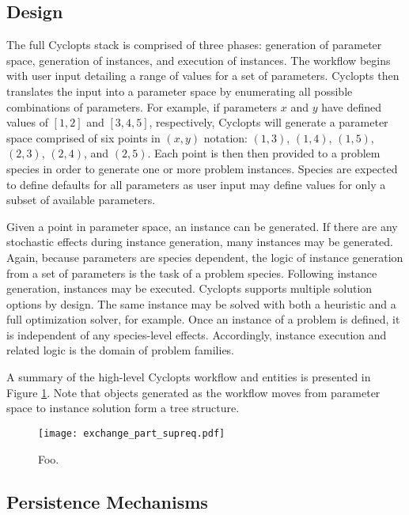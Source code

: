 \subsection{Design}\label{method:tools:struc}

The full Cyclopts stack is comprised of three phases: generation of parameter
space, generation of instances, and execution of instances. The workflow begins
with user input detailing a range of values for a set of parameters. Cyclopts
then translates the input into a parameter space by enumerating all possible
combinations of parameters. For example, if parameters $x$ and $y$ have defined
values of $[1, 2]$ and $[3, 4, 5]$, respectively, Cyclopts will generate a
parameter space comprised of six points in $(x, y)$ notation: $(1, 3)$, $(1,
4)$, $(1, 5)$, $(2, 3)$, $(2, 4)$, and $(2, 5)$. Each point is then then
provided to a problem species in order to generate one or more problem
instances. Species are expected to define defaults for all parameters as user
input may define values for only a subset of available parameters.

Given a point in parameter space, an instance can be generated. If there are any
stochastic effects during instance generation, many instances may be
generated. Again, because parameters are species dependent, the logic of
instance generation from a set of parameters is the task of a problem
species. Following instance generation, instances may be executed. Cyclopts
supports multiple solution options by design. The same instance may be solved
with both a heuristic and a full optimization solver, for example. Once an
instance of a problem is defined, it is independent of any species-level
effects. Accordingly, instance execution and related logic is the domain of
problem families. 

A summary of the high-level Cyclopts workflow and entities is presented in
Figure \ref{fig:lopts_desgin}. Note that objects generated as the workflow moves
from parameter space to instance solution form a tree structure.

\begin{figure}
  \begin{center}
    \texttt{[image: exchange\_part\_supreq.pdf]}
    \caption[]{
      \label{fig:lopts_desgin}
      Foo.}
  \end{center}
\end{figure}

\subsection{Persistence Mechanisms}\label{method:tools:hdf5}

